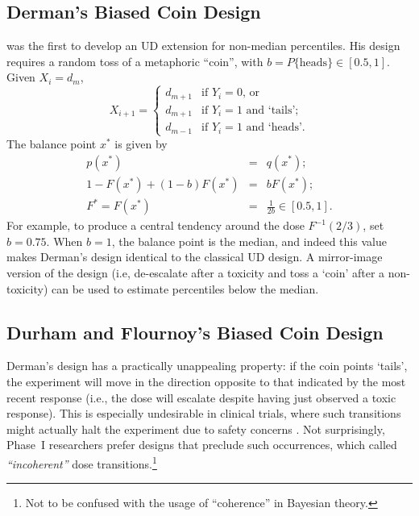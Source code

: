 \subsection{Derman's Biased Coin Design}
\cite{Derm:Nonp:1957} was the first to develop an UD extension for non-median percentiles. His design requires a random toss of a metaphoric ``coin'', with $b=P\{\textrm{heads}\}\in[0.5,1]$. Given $X_i=d_m$,
\begin{equation*}
X_{i+1}=
\begin{cases}
d_{m+1} &\textrm{if $Y_i=0$, or}\\
d_{m+1} & \textrm{if $Y_i=1$ and `tails'; }\\
d_{m-1} &\textrm{if $Y_i=1$ and `heads'.}
\end{cases}
\end{equation*}
The balance point $x^*$ is given by
\begin{equation}\label{eq:dermanx*}
\begin{array}{rcl}
p(x^*)&=&q(x^*);\\
1-F\left(x^*\right)+(1-b)F\left(x^*\right) &=& bF\left(x^*\right);\\
F^*=F\left(x^*\right) &=& \frac{1}{2b}\in[0.5,1].
\end{array}
\end{equation}
%
For example, to produce a central tendency around the dose $F^{-1}(2/3)$, set $b=0.75$. When $b=1$, the balance point is the median, and indeed this value makes Derman's design identical to the classical UD design. A mirror-image version of the design (i.e, de-escalate after a toxicity and toss a `coin' after a non-toxicity) can be used to estimate percentiles below the median.

\subsection{Durham and Flournoy's  Biased Coin Design}\label{sec:bcd}

Derman's design has a practically unappealing property: if the coin points `tails', the experiment will move in the direction opposite to that indicated by the most recent response (i.e., the dose will escalate despite having just observed a toxic response). This is especially undesirable in clinical trials, where such transitions might actually halt the experiment due to safety concerns \citep[e.g.,][]{Neunsch08}. Not surprisingly, Phase~I researchers prefer designs that preclude such occurrences, which \cite{Cheung:coherent:05} called \emph{``incoherent''} dose transitions.\footnote{Not to be confused with the usage of ``coherence'' in Bayesian theory.}

